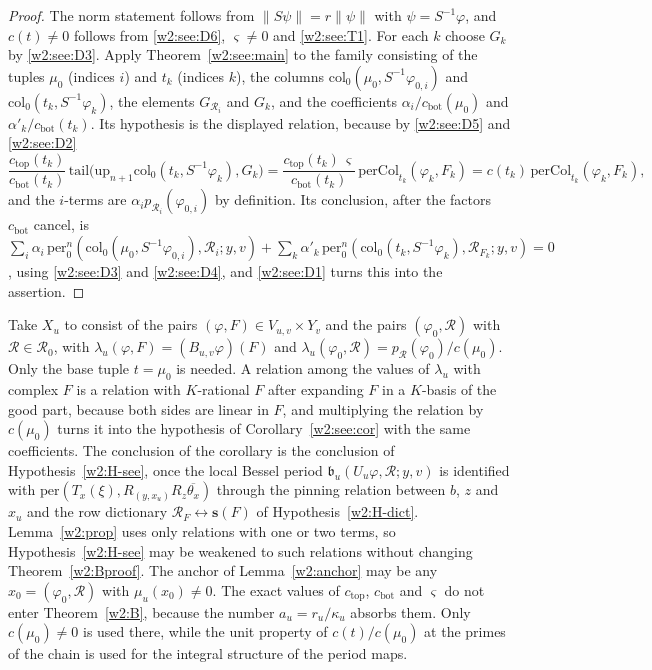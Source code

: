 \begin{proof}
The norm statement follows from $\lVert S\psi\rVert=r\lVert\psi\rVert$ with $\psi=S^{-1}\varphi$, and $c(t)\ne0$ follows from \ref{w2:see:D6}, $\varsigma\ne0$ and \ref{w2:see:T1}. For each $k$ choose $G_k$ by \ref{w2:see:D3}. Apply Theorem~\ref{w2:see:main} to the family consisting of the tuples $\mu_0$ (indices $i$) and $t_k$ (indices $k$), the columns $\mathrm{col}_0(\mu_0,S^{-1}\varphi_{0,i})$ and $\mathrm{col}_0(t_k,S^{-1}\varphi_k)$, the elements $G_{\mathcal R_i}$ and $G_k$, and the coefficients $\alpha_i/c_{\mathrm{bot}}(\mu_0)$ and $\alpha'_k/c_{\mathrm{bot}}(t_k)$. Its hypothesis is the displayed relation, because by \ref{w2:see:D5} and \ref{w2:see:D2}
\[
\frac{c_{\mathrm{top}}(t_k)}{c_{\mathrm{bot}}(t_k)}\,\mathrm{tail}\bigl(\mathrm{up}_{n+1}\mathrm{col}_0(t_k,S^{-1}\varphi_k),G_k\bigr)=\frac{c_{\mathrm{top}}(t_k)\,\varsigma}{c_{\mathrm{bot}}(t_k)}\,\mathrm{perCol}_{t_k}(\varphi_k,F_k)=c(t_k)\,\mathrm{perCol}_{t_k}(\varphi_k,F_k),
\]
and the $i$-terms are $\alpha_ip_{\mathcal R_i}(\varphi_{0,i})$ by definition. Its conclusion, after the factors $c_{\mathrm{bot}}$ cancel, is $\sum_i\alpha_i\,\mathrm{per}^n_0(\mathrm{col}_0(\mu_0,S^{-1}\varphi_{0,i}),\mathcal R_i;y,v)+\sum_k\alpha'_k\,\mathrm{per}^n_0(\mathrm{col}_0(t_k,S^{-1}\varphi_k),\mathcal R_{F_k};y,v)=0$, using \ref{w2:see:D3} and \ref{w2:see:D4}, and \ref{w2:see:D1} turns this into the assertion.
\end{proof}

\begin{remark}\label{w2:see:rem}
Take $X_u$ to consist of the pairs $(\varphi,F)\in V_{u,v}\times Y_v$ and the pairs $(\varphi_0,\mathcal R)$ with $\mathcal R\in\mathcal R_0$, with $\lambda_u(\varphi,F)=(B_{u,v}\varphi)(F)$ and $\lambda_u(\varphi_0,\mathcal R)=p_{\mathcal R}(\varphi_0)/c(\mu_0)$. Only the base tuple $t=\mu_0$ is needed. A relation among the values of $\lambda_u$ with complex $F$ is a relation with $K$-rational $F$ after expanding $F$ in a $K$-basis of the good part, because both sides are linear in $F$, and multiplying the relation by $c(\mu_0)$ turns it into the hypothesis of Corollary~\ref{w2:see:cor} with the same coefficients. The conclusion of the corollary is the conclusion of Hypothesis~\ref{w2:H-see}, once the local Bessel period $\mathfrak b_u(U_u\varphi,\mathcal R;y,v)$ is identified with $\mathrm{per}(T_x(\xi),R_{(y,x_u)}R_z\overline{\theta_x})$ through the pinning relation between $b$, $z$ and $x_u$ and the row dictionary $\mathcal R_F\leftrightarrow\mathbf s(F)$ of Hypothesis~\ref{w2:H-dict}. Lemma~\ref{w2:prop} uses only relations with one or two terms, so Hypothesis~\ref{w2:H-see} may be weakened to such relations without changing Theorem~\ref{w2:Bproof}. The anchor of Lemma~\ref{w2:anchor} may be any $x_0=(\varphi_0,\mathcal R)$ with $\mu_u(x_0)\ne0$. The exact values of $c_{\mathrm{top}}$, $c_{\mathrm{bot}}$ and $\varsigma$ do not enter Theorem~\ref{w2:B}, because the number $a_u=r_u/\kappa_u$ absorbs them. Only $c(\mu_0)\ne0$ is used there, while the unit property of $c(t)/c(\mu_0)$ at the primes of the chain is used for the integral structure of the period maps.
\end{remark}

